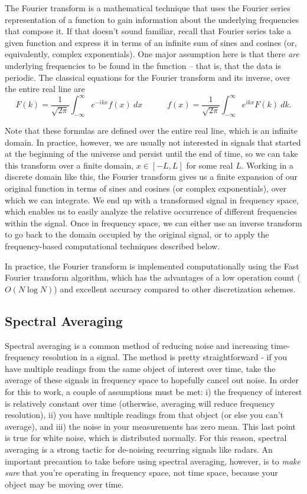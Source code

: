 \documentclass[a4paper,12 pt]{article}
\begin{document}
The Fourier transform is a mathematical technique that uses the Fourier series representation of a function to gain information about the underlying frequencies that compose it. If that doesn't sound familiar, recall that Fourier series take a given function and express it in terms of an infinite sum of sines and cosines (or, equivalently, complex exponentials). One major assumption here is that there \textit{are} underlying frequencies to be found in the function -- that is, that the data is periodic. The classical equations for the Fourier transform and its inverse, over the entire real line are
\begin{equation}
    F(k) = \frac{1}{\sqrt{2\pi}}\int_{-\infty}^{\infty}e^{-ikx}f(x)\:dx \quad\quad\quad f(x) = \frac{1}{\sqrt{2\pi}}\int_{-\infty}^{\infty} e^{ikx}F(k)\:dk.
\end{equation}

Note that these formulas are defined over the entire real line, which is an infinite domain. In practice, however, we are usually not interested in signals that started at the beginning of the universe and persist until the end of time, so we can take this transform over a finite domain, $x\in[-L,L]$ for some real $L$. Working in a discrete domain like this, the Fourier transform gives us a finite expansion of our original function in terms of sines and cosines (or complex exponentials), over which we can integrate. We end up with a transformed signal in frequency space, which enables us to easily analyze the relative occurrence of different frequencies within the signal. Once in frequency space, we can either use an inverse transform to go back to the domain occupied by the original signal, or to apply the frequency-based computational techniques described below.

In practice, the Fourier transform is implemented computationally using the Fast Fourier transform algorithm, which has the advantages of a low operation count ($O(N\log N)$) and excellent accuracy compared to other discretization schemes.

\subsection{Spectral Averaging}
Spectral averaging is a common method of reducing noise and increasing time-frequency resolution in a signal. The method is pretty straightforward - if you have multiple readings from the same object of interest over time, take the average of these signals in frequency space to hopefully cancel out noise. In order for this to work, a couple of assumptions must be met: i) the frequency of interest is relatively constant over time (otherwise, averaging will reduce frequency resolution), ii) you have multiple readings from that object (or else you can't average), and iii) the noise in your measurements has zero mean. This last point is true for white noise, which is distributed normally. For this reason, spectral averaging is a strong tactic for de-noising recurring signals like radars. An important precaution to take before using spectral averaging, however, is to \textit{make sure} that you're operating in frequency space, not time space, because your object may be moving over time.
\end{document}
